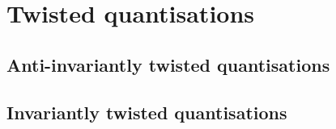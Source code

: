 \section{Twisted quantisations}
    \subsection{Anti-invariantly twisted quantisations}

    \subsection{Invariantly twisted quantisations}
